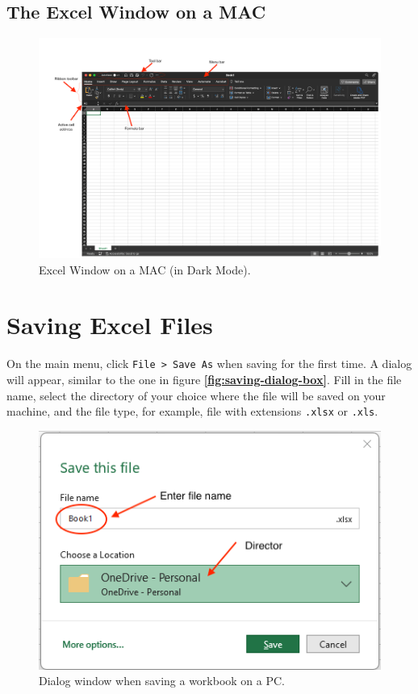\documentclass[
]{book}
\begin{document}
\hypertarget{the-excel-window-on-a-mac}{%
\subsection{The Excel Window on a MAC}\label{the-excel-window-on-a-mac}}

\begin{figure}

{\centering \includegraphics[width=1.4\linewidth]{window-mac} 

}

\caption{Excel Window on a MAC (in Dark Mode).}\label{fig:window-mac}
\end{figure}

\hypertarget{saving-excel-files}{%
\section{Saving Excel Files}\label{saving-excel-files}}

On the main menu, click \texttt{File\ \textgreater{}\ Save\ As} when saving for the first time. A dialog will appear, similar to the one in figure \textbf{\ref{fig:saving-dialog-box}}. Fill in the file name, select the directory of your choice where the file will be saved on your machine, and the file type, for example, file with extensions \texttt{.xlsx} or \texttt{.xls}.

\begin{figure}

{\centering \includegraphics[width=0.45\linewidth]{saving-pc2} 

}

\caption{Dialog window when saving a workbook on a PC.}\label{fig:saving-dialog-box-pc}
\end{figure}
\end{document}
